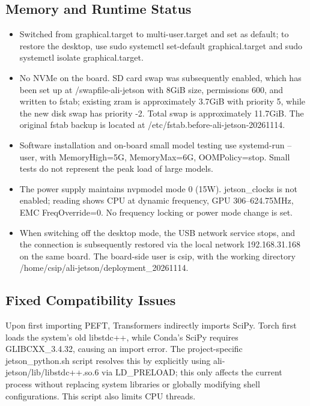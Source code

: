 \subsection{Memory and Runtime Status}\label{s21-detail-2}

\begin{itemize}
\tightlist
\item
  Switched from graphical.target to multi-user.target and set as default; to restore the desktop, use sudo systemctl set-default graphical.target and sudo systemctl isolate graphical.target.
\item
  No NVMe on the board. SD card swap was subsequently enabled, which has been set up at /swapfile-ali-jetson with 8GiB size, permissions 600, and written to fstab; existing zram is approximately 3.7GiB with priority 5, while the new disk swap has priority -2. Total swap is approximately 11.7GiB. The original fstab backup is located at /etc/fstab.before-ali-jetson-20261114.
\item
  Software installation and on-board small model testing use systemd-run --user, with MemoryHigh=5G, MemoryMax=6G, OOMPolicy=stop. Small tests do not represent the peak load of large models.
\item
  The power supply maintains nvpmodel mode 0 (15W). jetson\_clocks is not enabled; reading shows CPU at dynamic frequency, GPU 306--624.75MHz, EMC FreqOverride=0. No frequency locking or power mode change is set.
\item
  When switching off the desktop mode, the USB network service stops, and the connection is subsequently restored via the local network 192.168.31.168 on the same board. The board-side user is csip, with the working directory /home/csip/ali-jetson/deployment\_20261114.
\end{itemize}

\subsection{Fixed Compatibility Issues}\label{s21-detail-3}

Upon first importing PEFT, Transformers indirectly imports SciPy. Torch first loads the system's old libstdc++, while Conda's SciPy requires GLIBCXX\_3.4.32, causing an import error. The project-specific jetson\_python.sh script resolves this by explicitly using ali-jetson/lib/libstdc++.so.6 via LD\_PRELOAD; this only affects the current process without replacing system libraries or globally modifying shell configurations. This script also limits CPU threads.

